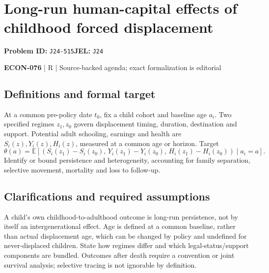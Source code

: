 \documentclass[11pt,a4paper]{article}
\begin{document}
\section*{Long-run human-capital effects of childhood forced displacement}
\textbf{Problem ID:} \texttt{J24-515}\quad \textbf{JEL:} \texttt{J24}\par
\label{problem:OP-0642}


\label{audited:ECON-076}

{\sffamily\small\color{muted}\textbf{ECON-076} | R | Source-backed agenda; exact formalization is editorial\par}

\subsection*{Definitions and formal target}

At a common pre-policy date \(t_0\), fix a child cohort and baseline age \(a_i\). Two specified regimes \(z_1,z_0\) govern displacement timing, duration, destination and support. Potential adult schooling, earnings and health are \(S_i(z),Y_i(z),H_i(z)\), measured at a common age or horizon. Target
\[
 \theta(a)=\mathbb E[(S_i(z_1)-S_i(z_0),\,Y_i(z_1)-Y_i(z_0),\,
                     H_i(z_1)-H_i(z_0))\mid a_i=a].
\]
Identify or bound persistence and heterogeneity, accounting for family separation, selective movement, mortality and loss to follow-up.

\subsection*{Clarifications and required assumptions}

A child's own childhood-to-adulthood outcome is long-run persistence, not by itself an intergenerational effect. Age is defined at a common baseline, rather than actual displacement age, which can be changed by policy and undefined for never-displaced children. State how regimes differ and which legal-status/support components are bundled. Outcomes after death require a convention or joint survival analysis; selective tracing is not ignorable by definition.
\end{document}

